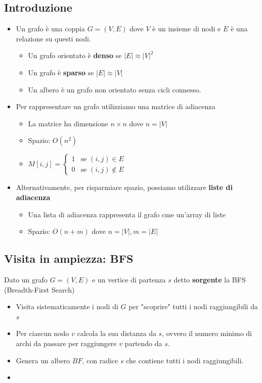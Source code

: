 \documentclass{article}
\begin{document}
\subsection{Introduzione}
\begin{itemize}
  \item Un grafo è una coppia \(G = (V,E)\) dove \(V\) è un insieme di nodi e \(E\) è una relazione su questi nodi.
        \begin{itemize}
          \item Un grafo orientato è \textbf{denso} se \(|E| \approx |V|^2\)
          \item Un grafo è \textbf{sparso} se \(|E| \approx |V|\)
          \item Un albero è un grafo non orientato senza cicli connesso.
        \end{itemize}
  \item Per rappresentare un grafo utilizziamo una matrice di adiacenza
        \begin{itemize}
          \item La matrice ha dimensione \(n \times n\) dove \(n = |V|\)
          \item Spazio: \(O(n^2)\)
          \item \( M[i,j] = \begin{cases}
                  1 & \text{se } (i,j) \in E    \\
                  0 & \text{se } (i,j) \notin E
                \end{cases} \)
        \end{itemize}
  \item Alternativamente, per risparmiare spazio, possiamo utilizzare \textbf{liste di adiacenza}
        \begin{itemize}
          \item Una lista di adiacenza rappresenta il grafo cme un'array di liste
          \item Spazio: \(O(n + m)\) dove \(n = |V|, m = |E|\)
        \end{itemize}
\end{itemize}
\newpage
\subsection{Visita in ampiezza: BFS}
Dato un grafo \(G = (V,E)\) e un vertice di partenza \(s\) detto \textbf{sorgente} la BFS (Breadth-First Search)
\begin{itemize}
  \item Visita sistematicamente i nodi di \(G\) per "scoprire" tutti i nodi raggiungibili da \(s\)
  \item Per ciascun nodo \(v\) calcola la sua distanza da \(s\), ovvero il numero minimo di archi da passare per raggiungere \(v\) partendo da \(s\).
  \item Genera un albero \(BF\), con radice \(s\) che contiene tutti i nodi raggiungibili.
  \item
\end{itemize}
\end{document}

